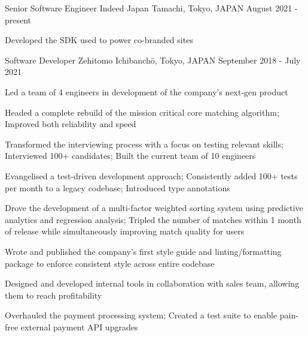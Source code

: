 
\begin{cventries}

  \cventry
  {Senior Software Engineer} %
  {Indeed Japan} %
  {Tamachi, Tokyo, JAPAN} %
  {August 2021 - present} %
  {
    \begin{cvitems} %
      \item {Developed the SDK used to power co-branded sites}
    \end{cvitems}
  }

  \cventry
  {Software Developer} %
  {Zehitomo} %
  {Ichibanchō, Tokyo, JAPAN} %
  {September 2018 - July 2021} %
  {
    \begin{cvitems} %
      \item {Led a team of 4 engineers in development of the company's next-gen product}
      \item {Headed a complete rebuild of the mission critical core matching algorithm; Improved both reliability and speed}
      \item {Transformed the interviewing process with a focus on testing relevant skills; Interviewed 100+ candidates; Built the current team of 10 engineers}
      \item {Evangelised a test-driven development approach; Consistently added 100+ tests per month to a legacy codebase; Introduced type annotations}
      \item {Drove the development of a multi-factor weighted sorting system using predictive analytics and regression analysis; Tripled the number of matches within 1 month of release while simultaneously improving match quality for users}
      \item {Wrote and published the company's first style guide and linting/formatting package to enforce consistent style across entire codebase}
      \item {Designed and developed internal tools in collaboration with sales team, allowing them to reach profitability}
      \item {Overhauled the payment processing system; Created a test suite to enable pain-free external payment API upgrades}
    \end{cvitems}
  }


\end{cventries}
